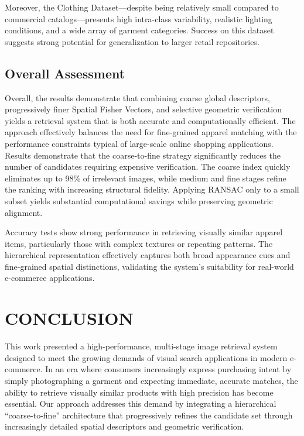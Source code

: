 \documentclass[conference]{IEEEtran}
\begin{document}
Moreover, the Clothing Dataset—despite being relatively small compared to commercial catalogs—presents high intra-class variability, realistic lighting conditions, and a wide array of garment categories. Success on this dataset suggests strong potential for generalization to larger retail repositories.

\subsection{Overall Assessment}
Overall, the results demonstrate that combining coarse global descriptors, progressively finer Spatial Fisher Vectors, and selective geometric verification yields a retrieval system that is both accurate and computationally efficient. The approach effectively balances the need for fine-grained apparel matching with the performance constraints typical of large-scale online shopping applications.
Results demonstrate that the coarse-to-fine strategy significantly reduces the number of candidates requiring expensive verification. The coarse index quickly eliminates up to 98\% of irrelevant images, while medium and fine stages refine the ranking with increasing structural fidelity. Applying RANSAC only to a small subset yields substantial computational savings while preserving geometric alignment.

Accuracy tests show strong performance in retrieving visually similar apparel items, particularly those with complex textures or repeating patterns. The hierarchical representation effectively captures both broad appearance cues and fine-grained spatial distinctions, validating the system’s suitability for real-world e-commerce applications.


\section{CONCLUSION}
This work presented a high-performance, multi-stage image retrieval system designed to meet the growing demands of visual search applications in modern e-commerce. In an era where consumers increasingly express purchasing intent by simply photographing a garment and expecting immediate, accurate matches, the ability to retrieve visually similar products with high precision has become essential. Our approach addresses this demand by integrating a hierarchical “coarse-to-fine” architecture that progressively refines the candidate set through increasingly detailed spatial descriptors and geometric verification.
\end{document}
